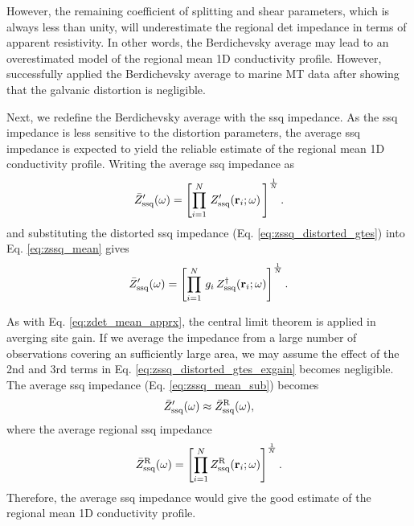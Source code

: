 	However, the remaining coefficient of splitting and shear parameters, which is always less than unity, will underestimate the regional det impedance in terms of apparent resistivity. 
	In other words, the Berdichevsky average may lead to an overestimated model of the regional mean 1D conductivity profile. 
	However, \citet{baba2010a} successfully applied the Berdichevsky average to marine MT data after showing that the galvanic distortion is negligible.
	
	 Next, we redefine the Berdichevsky average with the ssq impedance. As the ssq impedance is less sensitive to the distortion parameters, the average ssq impedance is expected to yield the reliable estimate of the regional mean 1D conductivity profile. Writing the average ssq impedance as 
	\begin{equation}\label{eq:zssq_mean}
				\ZssqDistortedMean\fxomega = \left[ \prod\limits_{i=1}^{N}\, \ZssqDistorted\fxriomega\,\right ]^\frac{1}{N}.
	\end{equation}
	and substituting the distorted ssq impedance (Eq. \ref{eq:zssq_distorted_gtes}) into Eq. \eqref{eq:zssq_mean} gives 
	\begin{equation}\label{eq:zssq_mean_sub}
		\ZssqDistortedMean\fxomega = \left[ \prod\limits_{i=1}^{N}\, \gainpi\, \ZssqDistortedExGain\fxriomega\right ]^\frac{1}{N}.
	\end{equation}

As with Eq. \eqref{eq:zdet_mean_apprx}, the central limit theorem is applied in averging site gain. 
If we average the impedance from a large number of observations covering an sufficiently large area, we may assume the effect of the 2nd and 3rd terms in Eq. \eqref{eq:zssq_distorted_gtes_exgain} becomes negligible. The average ssq impedance (Eq. \ref{eq:zssq_mean_sub}) becomes
\begin{equation}\label{eq:zssq_mean_apprx}
		\ZssqDistortedMean\fxomega \approx \ZssqUndistortedMean\fxomega,
\end{equation}
	where the average regional ssq impedance 
	\begin{equation}
		\bar{Z}_{\mathrm{ssq}}^{\text{R}}(\omega) = \left[ \prod\limits_{i=1}^{N}  Z_\text{ssq}^{\text{R}}(\mathbf{r}_i;\omega) \right]^\frac{1}{N}.
	\end{equation}
	Therefore, the average ssq impedance would give the good estimate of the regional mean 1D conductivity profile.

